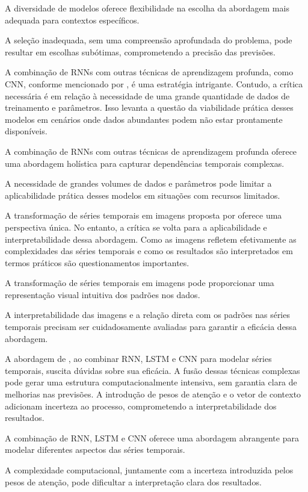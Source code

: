 A diversidade de modelos oferece flexibilidade na escolha da abordagem mais adequada para contextos específicos.

A seleção inadequada, sem uma compreensão aprofundada do problema, pode resultar em escolhas subótimas, comprometendo a precisão das previsões.

A combinação de RNNs com outras técnicas de aprendizagem profunda, como CNN, conforme mencionado por , é uma estratégia intrigante. Contudo, a crítica necessária é em relação à necessidade de uma grande quantidade de dados de treinamento e parâmetros. Isso levanta a questão da viabilidade prática desses modelos em cenários onde dados abundantes podem não estar prontamente disponíveis.

A combinação de RNNs com outras técnicas de aprendizagem profunda oferece uma abordagem holística para capturar dependências temporais complexas.

A necessidade de grandes volumes de dados e parâmetros pode limitar a aplicabilidade prática desses modelos em situações com recursos limitados.

A transformação de séries temporais em imagens proposta por  oferece uma perspectiva única. No entanto, a crítica se volta para a aplicabilidade e interpretabilidade dessa abordagem. Como as imagens refletem efetivamente as complexidades das séries temporais e como os resultados são interpretados em termos práticos são questionamentos importantes.

A transformação de séries temporais em imagens pode proporcionar uma representação visual intuitiva dos padrões nos dados.

A interpretabilidade das imagens e a relação direta com os padrões nas séries temporais precisam ser cuidadosamente avaliadas para garantir a eficácia dessa abordagem.

A abordagem de , ao combinar RNN, LSTM e CNN para modelar séries temporais, suscita dúvidas sobre sua eficácia. A fusão dessas técnicas complexas pode gerar uma estrutura computacionalmente intensiva, sem garantia clara de melhorias nas previsões. A introdução de pesos de atenção e o vetor de contexto adicionam incerteza ao processo, comprometendo a interpretabilidade dos resultados.

A combinação de RNN, LSTM e CNN oferece uma abordagem abrangente para modelar diferentes aspectos das séries temporais.

A complexidade computacional, juntamente com a incerteza introduzida pelos pesos de atenção, pode dificultar a interpretação clara dos resultados.

